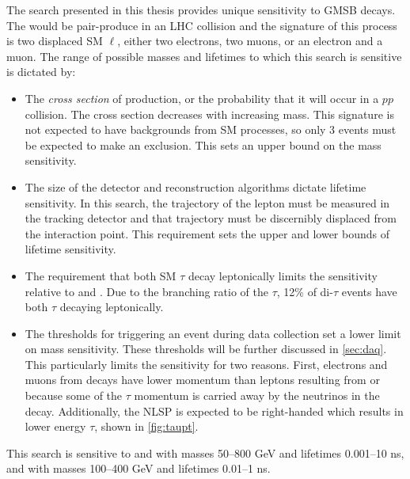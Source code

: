 The search presented in this thesis provides unique sensitivity to \ac{GMSB} \slep decays. The \slep would be pair-produce in an \ac{LHC} collision and the signature of this process is two displaced \ac{SM} $\ell$, either two electrons, two muons, or an electron and a muon. The range of possible \slep masses and lifetimes to which this search is sensitive is dictated by:
\begin{itemize}
	\item The \emph{cross section} of \slep production, or the probability that it will occur in a $pp$ collision. The cross section decreases with increasing \slep mass. This signature is not expected to have backgrounds from \ac{SM} processes, so only 3 events must be expected to make an exclusion. This sets an upper bound on the mass sensitivity.
	\item The size of the detector and reconstruction algorithms dictate lifetime sensitivity. In this search, the trajectory of the lepton must be measured in the tracking detector and that trajectory must be discernibly displaced from the interaction point. This requirement sets the upper and lower bounds of lifetime sensitivity.
	\item The requirement that both \ac{SM} $\tau$ decay leptonically limits the \stau sensitivity relative to \selec and \smu. Due to the branching ratio of the $\tau$, 12\% of di-$\tau$ events have both $\tau$ decaying leptonically. 
	\item The thresholds for triggering an event during data collection set a lower limit on mass sensitivity. These thresholds will be further discussed in \autoref{sec:daq}. This particularly limits the \stau sensitivity for two reasons. First, electrons and muons from \stau decays have lower momentum than leptons resulting from \selec or \smu because some of the $\tau$ momentum is carried away by the neutrinos in the decay. Additionally, the \stau \ac{NLSP} is expected to be right-handed which results in lower energy $\tau$, shown in \autoref{fig:taupt}. 
\end{itemize}



This search is sensitive to \selec and \smu with masses 50--800 GeV and lifetimes 0.001--10 ns, and \stau with masses 100--400 GeV and lifetimes 0.01--1 ns.

